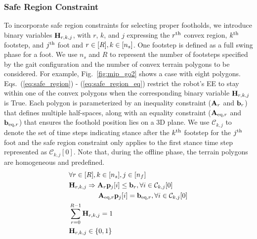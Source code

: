 \subsubsection{Safe Region Constraint}
To incorporate safe region constraints for selecting proper footholds, we introduce binary variables $\mathbf{H}_{r,k,j}$, with $r$, $k$, and $j$ expressing the $r^{\rm th}$ convex region, $k^{\rm th}$ footstep, and $j^{\rm th}$ foot and $r\in[R], k\in[n_s]$. One footstep is defined as a full swing phase for a foot. We use $n_s$ and $R$ to represent the number of footsteps specified by the gait configuration and the number of convex terrain polygons to be considered. For example,  Fig.~\ref{fig:mip_go2} shows a case with eight polygons.
Eqs.~(\ref{eq:safe_region}) - (\ref{eq:safe_region_eq}) restrict
the robot's EE to stay within one of the convex polygons when the corresponding binary variable $\mathbf{H}_{r,k,j}$ is True. 
Each polygon is parameterized by an inequality constraint ($\mathbf{A}_r$ and $\mathbf{b}_r$) that defines multiple half-spaces, along with an equality constraint ($\mathbf{A}_{\text{eq},r}$ and $\mathbf{b}_{\text{eq},r}$) that ensures the foothold position lies on a 3D plane.
We use $\mathcal{C}_{k,j}$ to denote the set of time steps indicating stance after the $k^{\rm th}$ footstep for the $j^{\rm th}$ foot and the safe region constraint only applies to the first stance time step represented as $\mathcal{C}_{k,j}[0]$. Note that, during the offline phase, the terrain polygons are homogeneous and predefined.
\begin{align}
\nonumber
&\forall r \in [R], k \in [n_s], j \in [n_f]\\
    \label{eq:safe_region} &\mathbf{H}_{r,k,j} \Rightarrow \mathbf{A}_r \mathbf{p}_j[i] \leq \mathbf{b}_r, \forall i \in \mathcal{C}_{k,j}[0]
        \\\label{eq:safe_region_eq} & \hspace{1.5cm} \mathbf{A}_{\text{eq},r} \mathbf{p}_j[i] = \mathbf{b}_{\text{eq},r}, \forall i \in \mathcal{C}_{k,j}[0]
        \\\label{eq:sum_contact_binary} &\sum_{r=0}^{R-1}\mathbf{H}_{r,k,j} = 1
        \\&\mathbf{H}_{r,k,j} \in \{0, 1\}
\end{align}

